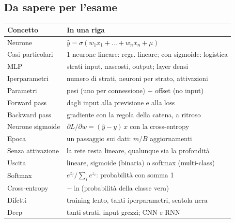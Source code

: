 \subsection{Da sapere per l'esame}
\begin{center}
    \begin{tabular}{l|l}
        \textbf{Concetto} & \textbf{In una riga} \\ \hline
        Neurone            & $\widehat{y} = \sigma(w_1x_1 + \dots + w_nx_n + \mu)$ \\ \hline
        Casi particolari   & 1 neurone lineare: regr. lineare; con sigmoide: logistica \\ \hline
        MLP                & strati input, nascosti, output; layer densi \\ \hline
        Iperparametri      & numero di strati, neuroni per strato, attivazioni \\ \hline
        Parametri          & pesi (uno per connessione) + offset (no input) \\ \hline
        Forward pass       & dagli input alla previsione e alla loss \\ \hline
        Backward pass      & gradiente con la regola della catena, a ritroso \\ \hline
        Neurone sigmoide   & $\partial L/\partial w = (\widehat{y} - y)\,x$ con la cross-entropy \\ \hline
        Epoca              & un passaggio sui dati: $m/B$ aggiornamenti \\ \hline
        Senza attivazione  & la rete resta lineare, qualunque sia la profondità \\ \hline
        Uscita             & lineare, sigmoide (binaria) o softmax (multi-class) \\ \hline
        Softmax            & $e^{z_j}/\sum_i e^{z_i}$: probabilità con somma 1 \\ \hline
        Cross-entropy      & $-\ln$(probabilità della classe vera) \\ \hline
        Difetti            & training lento, tanti iperparametri, scatola nera \\ \hline
        Deep               & tanti strati, input grezzi; CNN e RNN \\
    \end{tabular}
\end{center}
